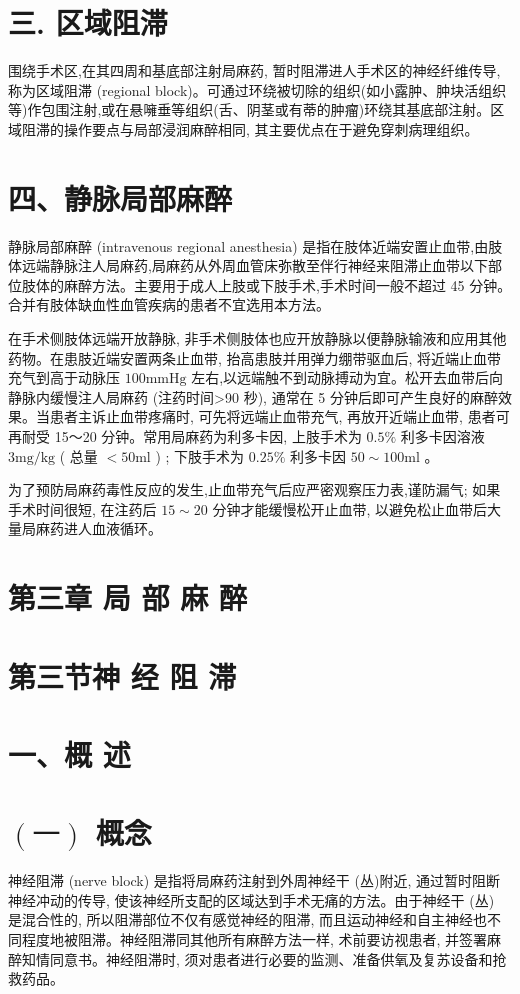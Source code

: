 \documentclass[10pt]{article}
\begin{document}
\section*{三. 区域阻滞}
围绕手术区,在其四周和基底部注射局麻药, 暂时阻滞进人手术区的神经纤维传导, 称为区域阻滞 (regional block)。可通过环绕被切除的组织(如小露肿、肿块活组织等)作包围注射,或在悬噰垂等组织(舌、阴茎或有蒂的肿瘤)环绕其基底部注射。区域阻滞的操作要点与局部浸润麻醉相同, 其主要优点在于避免穿刺病理组织。

\section*{四、静脉局部麻醉}
静脉局部麻醉 (intravenous regional anesthesia) 是指在肢体近端安置止血带,由肢体远端静脉注人局麻药,局麻药从外周血管床弥散至伴行神经来阻滞止血带以下部位肢体的麻醉方法。主要用于成人上肢或下肢手术,手术时间一般不超过 45 分钟。合并有肢体缺血性血管疾病的患者不宜选用本方法。

在手术侧肢体远端开放静脉, 非手术侧肢体也应开放静脉以便静脉输液和应用其他药物。在患肢近端安置两条止血带, 抬高患肢并用弹力绷带驱血后, 将近端止血带充气到高于动脉压 $100 \mathrm{mmHg}$ 左右,以远端触不到动脉搏动为宜。松开去血带后向静脉内缓慢注人局麻药 (注药时间>90 秒), 通常在 5 分钟后即可产生良好的麻醉效果。当患者主诉止血带疼痛时, 可先将远端止血带充气, 再放开近端止血带, 患者可再耐受 15～20 分钟。常用局麻药为利多卡因, 上肢手术为 $0.5 \%$ 利多卡因溶液 $3 \mathrm{mg} / \mathrm{kg}$ ( 总量 $<50 \mathrm{ml}$ ) ; 下肢手术为 $0.25 \%$ 利多卡因 $50 \sim 100 \mathrm{ml}$ 。

为了预防局麻药毒性反应的发生,止血带充气后应严密观察压力表,谨防漏气; 如果手术时间很短, 在注药后 $15 \sim 20$ 分钟才能缓慢松开止血带, 以避免松止血带后大量局麻药进人血液循环。

\section*{第三章 局 部 麻 醉}
\section*{第三节神 经 阻 滞}
\section*{一、概 述}
\section*{$(一)$ 概念}
神经阻滞 (nerve block) 是指将局麻药注射到外周神经干 (丛)附近, 通过暂时阻断神经冲动的传导, 使该神经所支配的区域达到手术无痛的方法。由于神经干 (丛) 是混合性的, 所以阻滞部位不仅有感觉神经的阻滞, 而且运动神经和自主神经也不同程度地被阻滞。神经阻滞同其他所有麻醉方法一样, 术前要访视患者, 并签署麻醉知情同意书。神经阻滞时, 须对患者进行必要的监测、准备供氧及复苏设备和抢救药品。
\end{document}

